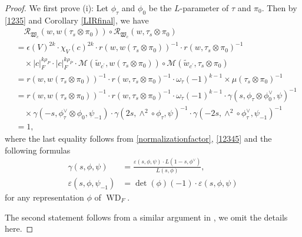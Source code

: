 \documentclass[article]{article}
\numberwithin{equation}{section}
\theoremstyle{definition}
\DeclareMathOperator{\WD}{WD}
\begin{document}
\begin{proof}
	We first prove (i): Let $\phi_\tau$ and $\phi_{0}$ be the $L$-parameter of $\tau$ and $\pi_0$. Then by \ref{1235} and Corollary \ref{LIRfinal}, we have 
	\begin{align*}
	 &\quad\mathcal R_{\mathfrak W_c}\left(w, w(\tau_{s} \otimes \pi_0)\right)\circ \mathcal R_{\mathfrak W_c}\left(w, \tau_{s} \otimes \pi_0\right)\\
	&=\epsilon(V)^{2k}\cdot \chi_{V}(c)^{2k}\cdot  r(w,w(\tau_s\otimes\pi_{0}))^{-1}\cdot r(w,\tau_s\otimes\pi_{0})^{-1}\\
	& \quad \times|c|_F^{k\rho_P}\cdot |c|_F^{k\rho_{\overline P}}\cdot \mathcal M(\widetilde{w}_{c^\prime},w(\tau_{s}\otimes \pi_0))\circ \mathcal M(\widetilde{w}_{c^\prime},\tau_{s}\otimes \pi_0)\\
	&=r(w,w(\tau_s\otimes\pi_{0}))^{-1}\cdot r(w,\tau_s\otimes\pi_{0})^{-1}\cdot \omega_{\tau}(- 1)^{k-1}\times \mu(\tau_{s}\otimes\pi_0)^{-1}\\
	&=r(w,w(\tau_s\otimes\pi_{0}))^{-1}\cdot r(w,\tau_s\otimes\pi_{0})^{-1}\cdot \omega_{\tau}(- 1)^{k-1}\cdot \gamma(s,\phi_{\tau}\otimes \phi_{0}^{\vee},\psi)^{-1}\\
	&\quad \times\gamma(-s,\phi_{\tau}^{\vee}\otimes\phi_0, \psi_{-1} )\cdot
   \gamma (2s, \wedge^2\circ \phi_{\tau}, \psi)^{-1}\cdot \gamma(-2s, \wedge^{2} \circ \phi_{\tau}^{\vee},\psi_{-1})^{-1}\\
	&=1,
\end{align*}
where the last equality follows from \ref{normalizationfactor}, \ref{12345} and the following formulas 
	\begin{align*}
	\gamma(s,\phi,\psi)&= \frac{\varepsilon(s,\phi,\psi)\cdot L(1-s,\phi^\vee)}{L(s,\phi)} ,\\
	\varepsilon(s,\phi,\psi_{-1})&=\det(\phi)(-1)\cdot  \varepsilon(s,\phi,\psi)
	\end{align*}
	for any representation $\phi$ of $\WD_F$. 
	 
	The second statement follows from a similar argument in \cite[Proposition 2.3.1]{MR3135650}, we omit the details here. 
\end{proof}


\end{document}
